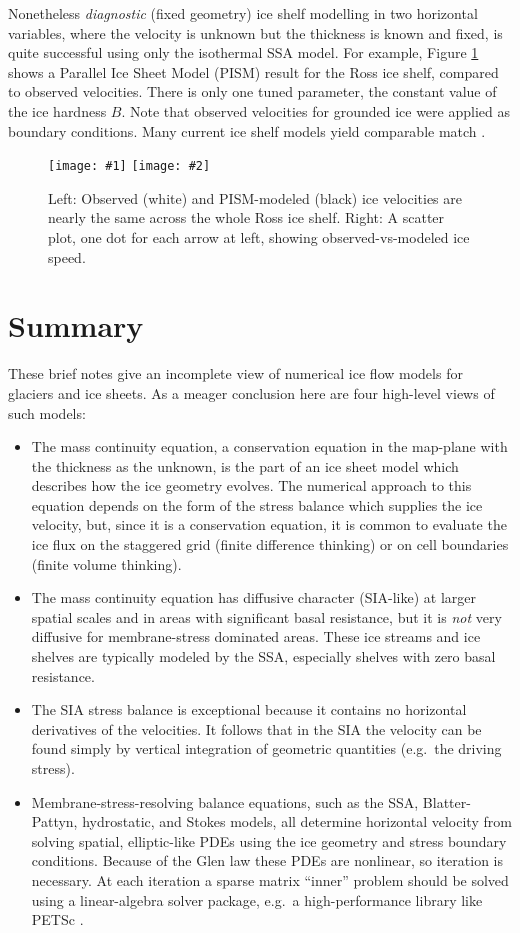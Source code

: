 \documentclass[letterpaper,final,12pt,reqno]{amsart}
\newcommand{\twofigsizes}[5]{
\begin{figure}[ht]
\centering
\texttt{[image: \#1]} \quad
\texttt{[image: \#2]}
\caption{#3}
\label{fig:#1}
\end{figure}}
\begin{document}
Nonetheless \emph{diagnostic} (fixed geometry) ice shelf modelling in two horizontal variables, where the velocity is unknown but the thickness is known and fixed, is quite successful using only the isothermal SSA model.  For example, Figure \ref{fig:rossquiver} shows a Parallel Ice Sheet Model (PISM) \cite{BBssasliding,Winkelmannetal2011} result for the Ross ice shelf, compared to observed velocities.  There is only one tuned parameter, the constant value of the ice hardness $B$.  Note that observed velocities for grounded ice were applied as boundary conditions.  Many current ice shelf models yield comparable match \cite{MacAyealetal}.

\twofigsizes{rossquiver}{rossscatter}{Left: Observed (white) and PISM-modeled (black) ice velocities are nearly the same across the whole Ross ice shelf.  Right: A scatter plot, one dot for each arrow at left, showing observed-vs-modeled ice speed.}{2.85in}{3.0in}


\section{Summary} \label{sec:summary}

These brief notes give an incomplete view of numerical ice flow models for glaciers and ice sheets.  As a meager conclusion here are four high-level views of such models:
\begin{itemize}
\item The mass continuity equation, a conservation equation in the map-plane with the thickness as the unknown, is the part of an ice sheet model which describes how the ice geometry evolves.  The numerical approach to this equation depends on the form of the stress balance which supplies the ice velocity, but, since it is a conservation equation, it is common to evaluate the ice flux on the staggered grid (finite difference thinking) or on cell boundaries (finite volume thinking).
\item The mass continuity equation has diffusive character (SIA-like) at larger spatial scales and in areas with significant basal resistance, but it is \emph{not} very diffusive for membrane-stress dominated areas.  These ice streams and ice shelves are typically modeled by the SSA, especially shelves with zero basal resistance.
\item The SIA stress balance is exceptional because it contains no horizontal derivatives of the velocities.  It follows that in the SIA the velocity can be found simply by vertical integration of geometric quantities (e.g.~the driving stress).
\item Membrane-stress-resolving balance equations, such as the SSA, Blatter-Pattyn, hydrostatic, and Stokes models, all determine horizontal velocity from solving spatial, elliptic-like PDEs using the ice geometry and stress boundary conditions.  Because of the Glen law these PDEs are nonlinear, so iteration is necessary.  At each iteration a sparse matrix ``inner'' problem should be solved using a linear-algebra solver package, e.g.~a high-performance library like PETSc \cite{Bueler2021}.
\end{itemize}
\end{document}
